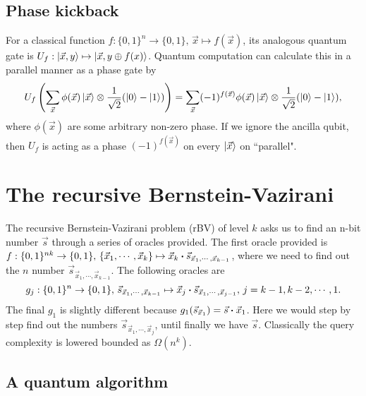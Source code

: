 \documentclass{article}
\begin{document}
\subsection{Phase kickback}
\label{sec:Phase kick}
For a classical function $f:\{0,1\}^n\to \{0,1\},\, \vec{x}\mapsto f(\vec{x})$,
its analogous quantum gate is $U_f:\ket{\vec{x},y} \mapsto \ket{\vec{x},y\oplus
f(x)}$. Quantum computation can calculate this in a parallel manner as a phase
gate by
\begin{equation}
  U_f \left(\sum_{\vec{x}} \phi(\vec{x})  \ket{\vec{x}}
  \otimes \frac{1}{\sqrt{2}} (\ket{0}-\ket{1}) \right)
  = \sum_{\vec{x}} (-1)^{f(\vec{x})} \phi(\vec{x})\ket{\vec{x}} 
  \otimes \frac{1}{\sqrt{2}} (\ket{0}-\ket{1}),
\end{equation}
where $\phi(\vec{x})$ are some arbitrary non-zero phase. If we ignore the
ancilla qubit, then $U_f$ is acting as a phase $(-1)^{f(\vec{x})}$ on every
$\ket{\vec{x}}$ on ``parallel".


\section{The recursive Bernstein-Vazirani}
\label{sec:The recursive Bernstein-Vazirani}

The recursive Bernstein-Vazirani problem (rBV) of level $k$ asks us to find an n-bit number
$\vec{s}$ through a series of oracles provided. The first oracle provided is
$f:\{0,1\}^{nk}\to \{0,1\},\, \{\vec{x}_1,\cdots, \vec{x}_k\}\mapsto
\vec{x}_k\vdot \vec{s}_{\vec{x}_1,\cdots,\vec{x}_{k-1}}$, where we need to find
out the $n$ number $\vec{s}_{\vec{x}_1,\cdots,\vec{x}_{k-1}}$. The following
oracles are 
\begin{equation}
  g_j: \{0,1\}^n\to \{0,1\},\, \vec{s}_{\vec{x}_1,\cdots,\vec{x}_{k-1}}
  \mapsto \vec{x}_j \vdot \vec{s}_{\vec{x}_1,\cdots,\vec{x}_{j-1}},\,
  j=k-1,k-2,\cdots,1.
\end{equation}
The final $g_1$ is slightly different because
$g_1(\vec{s}_{\vec{x}_1})=\vec{s}\vdot\vec{x}_1$. Here we would step by step
find out the numbers $\vec{s}_{\vec{x}_1,\cdots,\vec{x}_j}$, until finally we
have $\vec{s}$. Classically the query complexity is lowered bounded as
$\Omega(n^k)$.

\subsection{A quantum algorithm}
\label{sec:A quantum algorithm}
\end{document}
